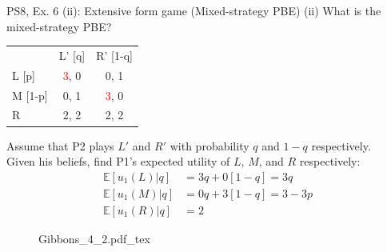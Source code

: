 \begin{frame}{PS8, Ex. 6 (ii): Extensive form game (Mixed-strategy PBE)}
    (ii) What is the mixed-strategy PBE? \vspace{-8pt}
    \begin{multicols}{2}
      \begin{table}
        \begin{tabular}{l|c|c|}
          \multicolumn{1}{c}{} & \multicolumn{1}{c}{L' [q]} & \multicolumn{1}{c}{R' [1-q]} \\\cline{2-3}
          L [p]   & \textcolor{red}{3}, 0 & 0, \color{blue}1 \\\cline{2-3}
          M [1-p] & 0, \color{blue}1 & \textcolor{red}{3}, 0 \\\cline{2-3}
          R       & 2, \color{blue}2 & 2, \color{blue}2 \\\cline{2-3}
        \end{tabular}
      \end{table} \vspace{-4pt}
      Assume that P2 plays $L'$ and $R'$ with probability $q$ and $1-q$ respectively.\\\smallskip
      Given his beliefs, find P1's expected utility of $L$, $M$, and $R$ respectively: \vspace{-4pt}
      \begin{align*}
        \mathbb{E}[u_1(L)|q]&=3q+0[1-q]=3q\\
        \mathbb{E}[u_1(M)|q]&=0q+3[1-q]=3-3p\\
        \mathbb{E}[u_1(R)|q]&=2
      \end{align*}
      \vfill\null\columnbreak
      \begin{figure}[!h]
        \center {}
        {Gibbons_4_2.pdf_tex}
      \end{figure}
      \vfill\null
    \end{multicols}
\end{frame}

